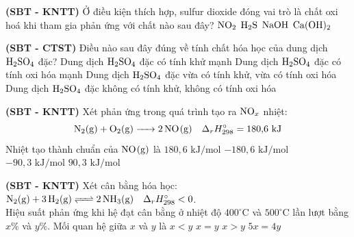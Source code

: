 \documentclass[12pt,a4paper]{article}
\begin{document}
\begin{ex}
\textbf{(SBT - KNTT)} Ở điều kiện thích hợp, sulfur dioxide đóng vai trò là chất oxi hoá khi tham gia phản ứng với chất nào sau đây?
\choice
{$\ce{NO2}$}
{\True $\ce{H2S}$}
{$\ce{NaOH}$}
{$\ce{Ca(OH)2}$}

\end{ex}

\begin{ex}
\textbf{(SBT - CTST)} Điều nào sau đây đúng về tính chất hóa học của dung dịch $\ce{H2SO4}$ đặc?
\choice
{Dung dịch $\ce{H2SO4}$ đặc có tính khử mạnh}
{\True Dung dịch $\ce{H2SO4}$ đặc có tính oxi hóa mạnh}
{Dung dịch $\ce{H2SO4}$ đặc vừa có tính khử, vừa có tính oxi hóa}
{Dung dịch $\ce{H2SO4}$ đặc không có tính khử, không có tính oxi hóa}

\end{ex}

\begin{ex}
\textbf{(SBT - KNTT)} Xét phản ứng trong quá trình tạo ra $\ce{NO_x}$ nhiệt:
\[\ce{N2(g) + O2(g) -> 2NO(g)} \quad \Delta_r H^\circ_{298} = 180{,}6\text{ kJ}\]
Nhiệt tạo thành chuẩn của $\ce{NO(g)}$ là
\choice
{$180{,}6\text{ kJ/mol}$}
{$-180{,}6\text{ kJ/mol}$}
{$-90{,}3\text{ kJ/mol}$}
{\True $90{,}3\text{ kJ/mol}$}

\end{ex}

\begin{ex}
\textbf{(SBT - KNTT)} Xét cân bằng hóa học: $\ce{N2(g) + 3H2(g) <=> 2NH3(g)} \quad \Delta_r H^\circ_{298} < 0$.\\
Hiệu suất phản ứng khi hệ đạt cân bằng ở nhiệt độ $400^\circ\text{C}$ và $500^\circ\text{C}$ lần lượt bằng $x\%$ và $y\%$. Mối quan hệ giữa $x$ và $y$ là
\choice
{$x < y$}
{$x = y$}
{\True $x > y$}
{$5x = 4y$}

\end{ex}
\end{document}
